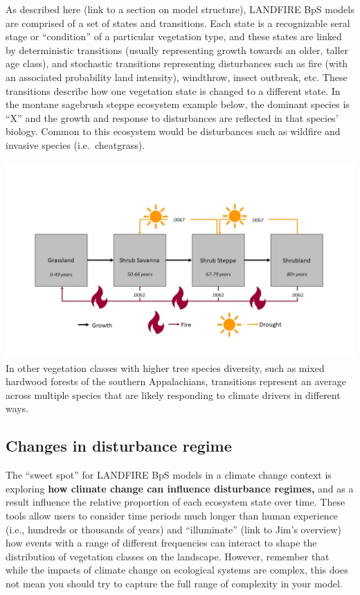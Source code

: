 \documentclass[
]{article}
\begin{document}
As described here (link to a section on model structure), LANDFIRE BpS
models are comprised of a set of states and transitions. Each state is a
recognizable seral stage or ``condition'' of a particular vegetation
type, and these states are linked by deterministic transitions (usually
representing growth towards an older, taller age class), and stochastic
transitions representing disturbances such as fire (with an associated
probability land intensity), windthrow, insect outbreak, etc. These
transitions describe how one vegetation state is changed to a different
state. In the montane sagebrush steppe ecosystem example below, the
dominant species is ``X'' and the growth and response to disturbances
are reflected in that species' biology. Common to this ecosystem would
be disturbances such as wildfire and invasive species (i.e.~cheatgrass).

\includegraphics{images/STSMex.jpg} In other vegetation classes with
higher tree species diversity, such as mixed hardwood forests of the
southern Appalachians, transitions represent an average across multiple
species that are likely responding to climate drivers in different ways.

\hypertarget{changes-in-disturbance-regime}{%
\subsection{Changes in disturbance
regime}\label{changes-in-disturbance-regime}}

The ``sweet spot'' for LANDFIRE BpS models in a climate change context
is exploring \textbf{how climate change can influence disturbance
regimes,} and as a result influence the relative proportion of each
ecosystem state over time. These tools allow users to consider time
periods much longer than human experience (i.e., hundreds or thousands
of years) and ``illuminate'' (link to Jim's overview) how events with a
range of different frequencies can interact to shape the distribution of
vegetation classes on the landscape. However, remember that while the
impacts of climate change on ecological systems are complex, this does
not mean you should try to capture the full range of complexity in your
model.
\end{document}
